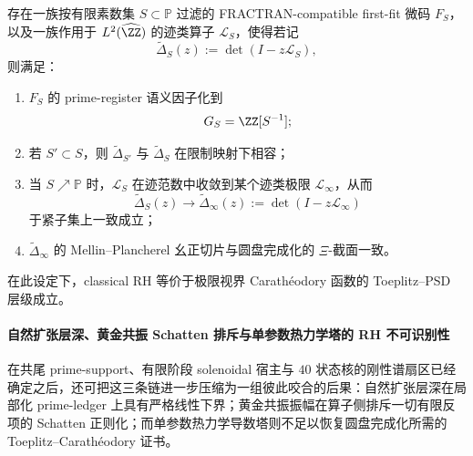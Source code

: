 \begin{conjecture}\label{conj:xi-time-part62ae-cofinal-primegame-xi-limit}
存在一族按有限素数集 \(S\subset\mathbb P\) 过滤的 FRACTRAN-compatible first-fit 微码 \(F_S\)，以及一族作用于 \(L^2(\widehat{\ZZ})\) 的迹类算子 \(\mathcal L_S\)，使得若记
\[
\widetilde\Delta_S(z):=\det(I-z\mathcal L_S),
\]
则满足：
\begin{enumerate}
  \item \(F_S\) 的 prime-register 语义因子化到
  \[
  G_S=\ZZ[S^{-1}];
  \]
  \item 若 \(S'\subset S\)，则 \(\widetilde\Delta_{S'}\) 与 \(\widetilde\Delta_S\) 在限制映射下相容；
  \item 当 \(S\nearrow \mathbb P\) 时，\(\mathcal L_S\) 在迹范数中收敛到某个迹类极限 \(\mathcal L_\infty\)，从而
  \[
  \widetilde\Delta_S(z)\longrightarrow
  \widetilde\Delta_\infty(z):=\det(I-z\mathcal L_\infty)
  \]
  于紧子集上一致成立；
  \item \(\widetilde\Delta_\infty\) 的 Mellin--Plancherel 幺正切片与圆盘完成化的 \(\Xi\)-截面一致。
\end{enumerate}
在此设定下，classical RH 等价于极限视界 Carath\'eodory 函数的 Toeplitz--PSD 层级成立。
\end{conjecture}

\paragraph{自然扩张层深、黄金共振 Schatten 排斥与单参数热力学塔的 RH 不可识别性}
在共尾 prime-support、有限阶段 solenoidal 宿主与 \(40\) 状态核的刚性谱扇区已经确定之后，还可把这三条链进一步压缩为一组彼此咬合的后果：自然扩张层深在局部化 prime-ledger 上具有严格线性下界；黄金共振振幅在算子侧排斥一切有限反项的 Schatten 正则化；而单参数热力学导数塔则不足以恢复圆盘完成化所需的 Toeplitz--Carath\'eodory 证书。

